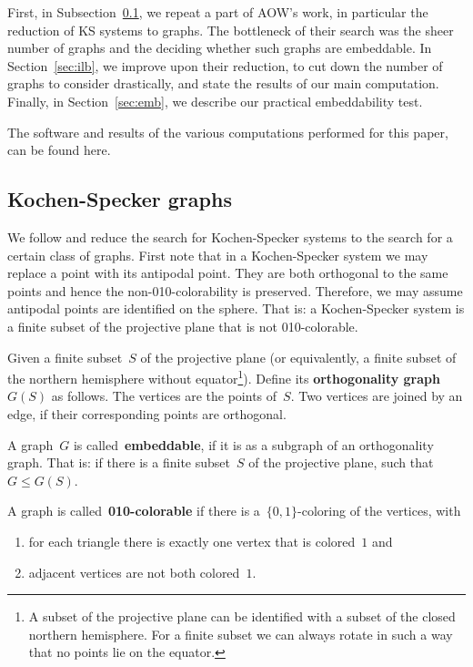 \documentclass{report}
\newcommand{\keyword}[1]{\textbf{#1}}
\begin{document}
First, in Subsection~\ref{sec:ksgraphs},
we repeat a part of AOW's work, in particular the reduction of
KS systems to graphs.
The bottleneck of their search was the sheer number of graphs
and the deciding whether such graphs are embeddable.
In Section~\ref{sec:ilb},
we improve upon their reduction,
to cut down the number of graphs to consider drastically,
and state the results of our main computation.
Finally, in Section~\ref{sec:emb},
we describe our practical embeddability test.

The software and results of the various computations performed for
this paper, can be found here\cite{GH}.

\subsection{Kochen-Specker graphs}
\label{sec:ksgraphs}
We follow \cite{aow11} and reduce the search for Kochen-Specker systems
to the search for a certain class of graphs.
First note that in a Kochen-Specker system we may replace a point with its
antipodal point.  They are both orthogonal to the same points and hence
the non-010-colorability is preserved.
Therefore, we may assume antipodal points are identified on the sphere.
That is: a Kochen-Specker system is a finite subset of the projective plane
that is not 010-colorable.

\begin{definition}
Given a finite subset~$S$ of the projective plane
(or equivalently, a finite subset of the northern
hemisphere without equator\footnote{%
    A subset of the projective plane can be identified with
    a subset of the closed northern hemisphere.
    For a finite subset we can always rotate in such a way
    that no points lie on the equator.}).
Define its \keyword{orthogonality graph}~$G(S)$ as follows.
The vertices are the points of~$S$.
Two vertices are joined by an edge, if their corresponding points
are orthogonal.
\end{definition}
\begin{definition}
A graph~$G$ is called~\keyword{embeddable},
if it is as a subgraph of an orthogonality graph.
That is: if there is a finite subset~$S$ of the projective plane,
such that~$G \leq G(S)$.
\end{definition}
\begin{definition}
A graph is called~\keyword{010-colorable}
if there is a~$\{0,1\}$-coloring of the vertices,
with
\begin{enumerate}
\item
for each triangle there is exactly one vertex that is colored~$1$ and
\item
adjacent vertices are not both colored~$1$.
\end{enumerate}
\end{definition}
\end{document}
